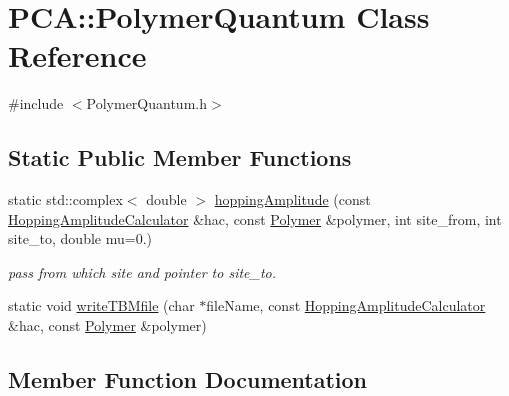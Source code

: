 \hypertarget{class_p_c_a_1_1_polymer_quantum}{}\section{P\+CA\+:\+:Polymer\+Quantum Class Reference}
\label{class_p_c_a_1_1_polymer_quantum}


{\ttfamily \#include $<$Polymer\+Quantum.\+h$>$}

\subsection*{Static Public Member Functions}
\begin{DoxyCompactItemize}
\item 
static std\+::complex$<$ double $>$ \hyperlink{class_p_c_a_1_1_polymer_quantum_a2f07ef3198c2a5ca75494df5364c1a89}{hopping\+Amplitude} (const \hyperlink{class_p_c_a_1_1_hopping_amplitude_calculator}{Hopping\+Amplitude\+Calculator} \&hac, const \hyperlink{class_p_c_a_1_1_polymer}{Polymer} \&polymer, int site\+\_\+from, int site\+\_\+to, double mu=0.)
\begin{DoxyCompactList}\small\item\em pass from which site and pointer to site\+\_\+to. \end{DoxyCompactList}\item 
static void \hyperlink{class_p_c_a_1_1_polymer_quantum_ac035f7bd1e3f5779d82048af7794e05d}{write\+T\+B\+Mfile} (char $\ast$file\+Name, const \hyperlink{class_p_c_a_1_1_hopping_amplitude_calculator}{Hopping\+Amplitude\+Calculator} \&hac, const \hyperlink{class_p_c_a_1_1_polymer}{Polymer} \&polymer)
\end{DoxyCompactItemize}


\subsection{Member Function Documentation}
\hypertarget{class_p_c_a_1_1_polymer_quantum_a2f07ef3198c2a5ca75494df5364c1a89}{}\label{class_p_c_a_1_1_polymer_quantum_a2f07ef3198c2a5ca75494df5364c1a89} 
